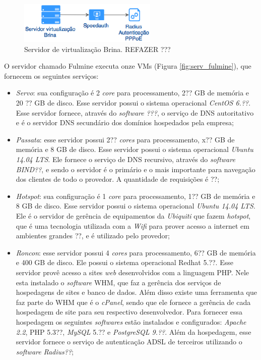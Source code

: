 \begin{figure}[h!]
 \centering
 \includegraphics[width=250px]{img/serv_brina.eps}
 \caption{Servidor de virtualização Brina. REFAZER ???}
 \label{fig:serv_brina}
\end{figure}

O servidor chamado Fulmine executa onze \ac{VM}s (Figura \ref{fig:serv_fulmine}), que fornecem os seguintes serviços:
\begin{itemize}
 \item \textit{Servo}: sua configuração é 2 \textit{core} para processamento, 2?? GB de memória e 20 ?? GB de disco. Esse servidor possui o 
 sistema operacional \textit{CentOS 6.??}. Esse servidor fornece, através do \textit{software} \textit{???}, o serviço de \ac{DNS} autoritativo 
 e é o servidor \ac{DNS} secundário dos domínios hospedados pela empresa;
 
 \item \textit{Passata}: esse servidor possui 2?? \textit{cores} para processamento, x?? GB de memória e 8 GB de disco. Esse servidor possui o 
 sistema operacional \textit{Ubuntu 14.04 \ac{LTS}}. Ele fornece o serviço de \ac{DNS} recursivo, através do \textit{software} \textit{BIND??}, 
 e sendo o servidor é o primário e o mais importante para navegação dos clientes de todo o provedor. A quantidade de requisições é ??;
 
 \item \textit{Hotspot}: sua configuração é 1 \textit{core} para processamento, 1?? GB de memória e 8 GB de disco. Esse servidor possui o 
 sistema operacional \textit{Ubuntu 14.04 \ac{LTS}}. Ele é o servidor de gerência de equipamentos da \textit{Ubiquiti} que fazem \textit{hotspot}, 
 que é uma tecnologia utilizada com a \textit{Wifi} para prover acesso a internet em ambientes grandes ??, e é utilizado pelo provedor;
 
 \item \textit{Roncon}: esse servidor possui 4 \textit{cores} para processamento, 6?? GB de memória e 400 GB de disco. Ele possui o sistema
 operacional Redhat 5.??. Esse servidor provê acesso a sites \textit{web} desenvolvidos com a linguagem \ac{PHP}. Nele esta instalado o 
 \textit{software} \ac{WHM}, que faz a gerência dos serviços de hospedagens de sites e banco de dados. Além disso existe uma ferramenta que 
 faz parte do \ac{WHM} que é o \textit{cPanel}, sendo que ele fornece a gerência de cada hospedagem de site para seu respectivo desenvolvedor.
 Para fornecer essa hospedagem os seguintes \textit{softwares} estão instalados e configurados: \textit{Apache 2.2}, \ac{PHP} 5.3??, 
 \textit{MySQL} 5.?? e \textit{PostgreSQL 9.??}.
 Além da hospedagem, esse servidor fornece o serviço de autenticação \ac{ADSL} de terceiros utilizando o \textit{software} \textit{Radius??};
 

\end{itemize}
